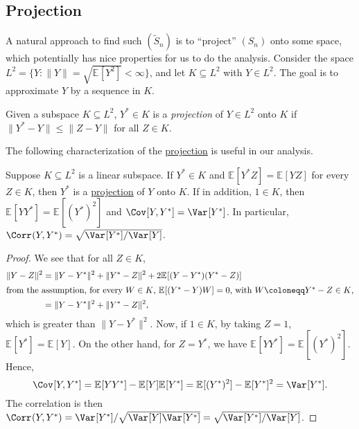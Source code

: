 \subsection{Projection}
A natural approach to find such \((\widetilde{S} _n)\) is to ``project'' \((S_n)\) onto some space, which potentially has nice properties for us to do the analysis. Consider the space \(L^2 = \{ Y \colon \lVert Y \rVert = \sqrt{\mathbb{E}_{}[Y^2] } < \infty \} \), and let \(K \subseteq L^2\) with \(Y \in L^2\). The goal is to approximate \(Y\) by a sequence in \(K\).

\begin{definition}[Projection]\label{def:projection}
	Given a subspace \(K \subseteq L^2\), \(Y^{\ast} \in K\) is a \emph{projection} of \(Y \in L^2\) onto \(K\) if \(\lVert Y^{\ast} - Y \rVert \leq \lVert Z - Y \rVert \) for all \(Z \in K\).
\end{definition}

The following characterization of the \hyperref[def:projection]{projection} is useful in our analysis.

\begin{proposition}\label{prop:projection}
	Suppose \(K \subseteq L^2\) is a linear subspace. If \(Y^{\ast} \in K\) and \(\mathbb{E}_{}[Y^{\ast} Z] = \mathbb{E}_{}[Y Z] \) for every \(Z \in K\), then \(Y^{\ast} \) is a \hyperref[def:projection]{projection} of \(Y\) onto \(K\). If in addition, \(1 \in K\), then \(\mathbb{E}_{}[Y Y^{\ast} ] = \mathbb{E}_{}[(Y^{\ast} )^2] \) and \(\Cov_{}[Y, Y^{\ast} ] = \Var_{}[Y^{\ast} ] \). In particular, \(\Corr_{}(Y, Y^{\ast} ) = \sqrt{\Var_{}[Y^{\ast} ] / \Var_{}[Y] } \).
\end{proposition}
\begin{proof}
	We see that for all \(Z \in K\),
	\begin{align*}
		\lVert Y - Z \rVert ^2
		 & = \lVert Y - Y^{\ast}  \rVert ^2 + \lVert Y^{\ast} - Z \rVert ^2 + 2 \mathbb{E}_{}[(Y-Y^{\ast} ) (Y^{\ast} - Z)] \\
		\shortintertext{from the assumption, for every \(W \in K\), \(\mathbb{E}_{}[(Y^{\ast} - Y) W] = 0 \), with \(W \coloneqq Y^{\ast} - Z \in K\),}
		 & = \lVert Y - Y^{\ast}  \rVert ^2 + \lVert Y^{\ast} - Z \rVert ^2,
	\end{align*}
	which is greater than \(\lVert Y - Y^{\ast} \rVert ^2\). Now, if \(1 \in K\), by taking \(Z = 1\), \(\mathbb{E}_{}[Y^{\ast} ] = \mathbb{E}_{}[Y] \). On the other hand, for \(Z = Y^{\ast} \), we have \(\mathbb{E}_{}[Y Y^{\ast} ] = \mathbb{E}_{}[(Y^{\ast} )^2] \). Hence,
	\[
		\Cov_{}[Y, Y^{\ast} ]
		= \mathbb{E}_{}[Y Y^{\ast} ] - \mathbb{E}_{}[Y] \mathbb{E}_{}[Y^{\ast} ]
		= \mathbb{E}_{}[(Y^{\ast} )^2] - \mathbb{E}_{}[Y^{\ast} ] ^2
		= \Var_{}[Y^{\ast} ].
	\]
	The correlation is then \(\Corr_{}(Y, Y^{\ast} ) = \Var_{}[Y^{\ast} ] / \sqrt{\Var_{}[Y] \Var_{}[Y^{\ast} ] } = \sqrt{\Var_{}[Y^{\ast} ] / \Var_{}[Y] }\).
\end{proof}

